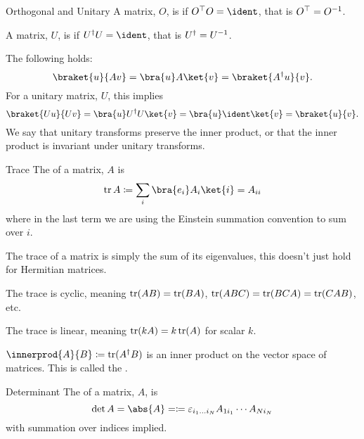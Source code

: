 \begin{dfn}{Orthogonal and Unitary}{}
    A matrix, \(O\), is  if \(O^\trans O = \ident\), that is \(O^\top = O^{-1}\).
    
    A matrix, \(U\), is  if \(U^\hermit U = \ident\), that is \(U^\dagger = U^{-1}\).
\end{dfn}

The following holds:
\begin{equation}
    \braket{u}{Av} = \bra{u}A\ket{v} = \braket{A^\hermit u}{v}.
\end{equation}
For a unitary matrix, \(U\), this implies
\begin{equation}
    \braket{Uu}{Uv} = \bra{u}U^\hermit U\ket{v} = \bra{u}\ident \ket{v} = \braket{u}{v}.
\end{equation}
We say that unitary transforms preserve the inner product, or that the inner product is invariant under unitary transforms.

\begin{dfn}{Trace}{}
    The  of a matrix, \(A\) is
    \begin{equation}
        \tr A \coloneqq \sum_{i} \bra{e_i} A_i \ket{i} = A_{ii}
    \end{equation}
    where in the last term we are using the Einstein summation convention to sum over \(i\).
\end{dfn}

The trace of a matrix is simply the sum of its eigenvalues, this doesn't just hold for Hermitian matrices.

The trace is cyclic, meaning \(\operatorname{tr}(AB) = \operatorname{tr}(BA)\), \(\operatorname{tr}(ABC) = \operatorname{tr}(BCA) = \operatorname{tr}(CAB)\), etc.

The trace is linear, meaning \(\operatorname{tr}(k A) = k\operatorname{tr}(A)\) for scalar \(k\).

\(\innerprod{A}{B} \coloneqq \tr(A^\hermit B)\) is an inner product on the vector space of matrices.
This is called the .

\begin{dfn}{Determinant}{}
    The  of a matrix, \(A\), is 
    \begin{equation}
        \det A = \abs{A} = \coloneqq \varepsilon_{i_1\dotso i_N} A_{1i_1}\dotsm A_{Ni_N}
    \end{equation}
    with summation over indices implied.
\end{dfn}

